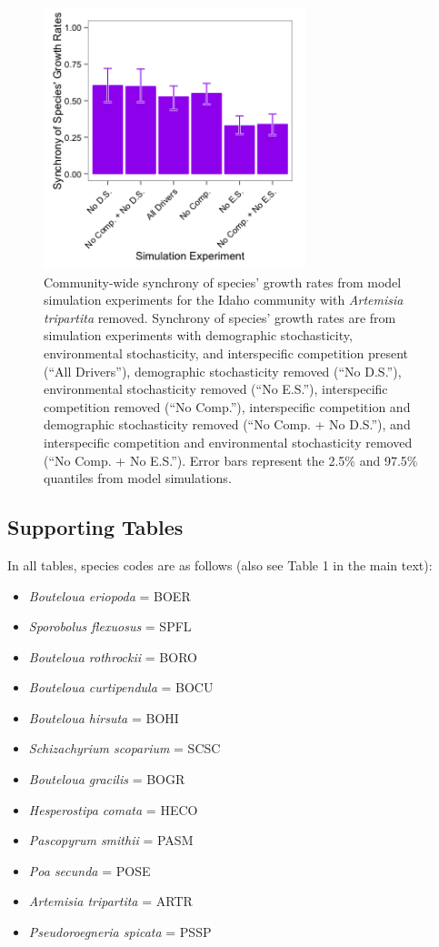 \documentclass[12pt,]{article}
\begin{document}
\begin{figure}[!ht]
  \centering
      \includegraphics[width=3in]{./components/formatted_figures/formatted_figureS4.png}
  \caption{Community-wide synchrony of species' growth rates from model simulation experiments for the Idaho community with \textit{Artemisia tripartita} removed. Synchrony of species' growth rates are from simulation experiments with demographic stochasticity, environmental stochasticity, and interspecific competition present (``All Drivers''), demographic stochasticity removed (``No D.S.''), environmental stochasticity removed (``No E.S.''), interspecific competition removed (``No Comp.''), interspecific competition and demographic stochasticity removed (``No Comp. + No D.S.''), and interspecific competition and environmental stochasticity removed (``No Comp. + No E.S.''). Error bars represent the 2.5\% and 97.5\% quantiles from model simulations.}
\end{figure}

\newpage{}

\subsection{Supporting Tables}\label{supporting-tables}

In all tables, species codes are as follows (also see Table 1 in the
main text):

\begin{itemize}
\itemsep1pt\parskip0pt
\item
  \emph{Bouteloua eriopoda} = BOER
\item
  \emph{Sporobolus flexuosus} = SPFL
\item
  \emph{Bouteloua rothrockii} = BORO
\item
  \emph{Bouteloua curtipendula} = BOCU
\item
  \emph{Bouteloua hirsuta} = BOHI
\item
  \emph{Schizachyrium scoparium} = SCSC
\item
  \emph{Bouteloua gracilis} = BOGR
\item
  \emph{Hesperostipa comata} = HECO
\item
  \emph{Pascopyrum smithii} = PASM
\item
  \emph{Poa secunda} = POSE
\item
  \emph{Artemisia tripartita} = ARTR
\item
  \emph{Pseudoroegneria spicata} = PSSP
\end{itemize}
\end{document}
